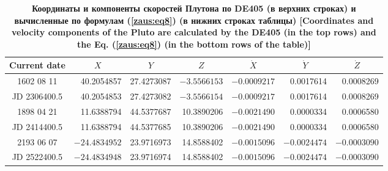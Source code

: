 \begin{table}
\begin{minipage}[t]{160mm}
\caption{\bf Координаты и компоненты скоростей Плутона по DE405 (в верхних строках) и вычисленные по формулам  (\ref{zaus:eq8}) (в нижних строках таблицы) [Coordinates and velocity components of the Pluto are calculated by the  DE405 (in the top rows) and the Eq. (\ref{zaus:eq8}) (in the bottom rows of the table)]
\vspace{-3mm}}
\begin{tabular}{|c|r|r|r|r|r|r|}
\hline
\footnotesize
\rule{0mm}{12pt}%
Current date & \multicolumn{1}{c|}{\footnotesize $X$}&	\multicolumn{1}{c|}{\footnotesize $Y$}&	\multicolumn{1}{c|}{\footnotesize $Z$}&	\multicolumn{1}{c|}{\footnotesize $\dot{X}$}&	\multicolumn{1}{c|}{\footnotesize $\dot{Y}$}&	\multicolumn{1}{c|}{\footnotesize$\dot{Z}$}\\ \hline
\rule{0mm}{14pt}%
%
1602 08 11&	40.2054857&	27.4273087&	$-3.5566153$&	$-0.0009217$&	0.0017614&	0.0008269\\
JD 2306400.5&	40.2054853&	27.4273082&	$-3.5566154$&	$-0.0009217$&	0.0017614&	0.0008269\\ \hline
1898 04 21&	11.6388794&	44.5377687&	10.3890206&	$-0.0021490$&	0.0000334&	 0.0006580\\
JD 2414400.5&	11.6388794&	44.5377685&	10.3890206&	$-0.0021490$&	0.0000334&	 0.0006580\\ \hline
2193 06 07&	$-24.4834952$&	23.9716973&	14.8588402&	$-0.0015096$&	$-0.0024474$&	$-0.0003090$\\
JD 2522400.5&	$-24.4834948$&	23.9716974&	14.8588402&	$-0.0015096$&	$-0.0024474$&	$-0.0003090$\\ \hline
\end{tabular}
\label{table:zausaev:tabl13}
\end{minipage}
\end{table}





